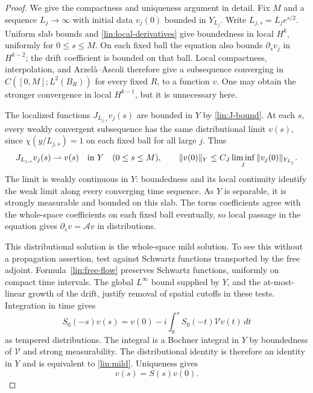 \documentclass[11pt]{article}
\numberwithin{equation}{section}
\theoremstyle{definition}
\theoremstyle{remark}
\begin{document}
\begin{proof}
We give the compactness and uniqueness argument in detail.  Fix $M$
and a sequence $L_j\to\infty$ with initial data $v_j(0)$ bounded in
$Y_{L_j}$.  Write $L_{j,s}=L_je^{s/2}$.  Uniform slab bounds and
\eqref{lin:local-derivatives} give boundedness in local $H^k$, uniformly
for $0\le s\le M$.  On each fixed ball the equation also bounds
$\partial_sv_j$ in $H^{k-2}$; the drift coefficient is bounded on
that ball.  Local compactness, interpolation, and Arzel\`a--Ascoli
therefore give a subsequence converging in
$C([0,M];L^2(B_R))$ for every fixed $R$, to a function $v$.
One may obtain the stronger convergence in local $H^{k-1}$, but it
is unnecessary here.

The localized functions $J_{L_{j,s}}v_j(s)$ are bounded in $Y$ by
\eqref{lin:J-bound}.  At each $s$, every weakly convergent subsequence
has the same distributional limit $v(s)$, since $\chi(y/L_{j,s})=1$
on each fixed ball for all large $j$.  Thus
\begin{equation}\label{lin:weak-local-limit}
 J_{L_{j,s}}v_j(s)\rightharpoonup v(s)\quad\hbox{in }Y
 \quad(0\le s\le M),\qquad
 \|v(0)\|_Y\le C_J\liminf_j\|v_j(0)\|_{Y_{L_j}}.
\end{equation}
The limit is weakly continuous in $Y$: boundedness and its local
continuity identify the weak limit along every converging time
sequence.  As $Y$ is separable, it is strongly measurable and bounded
on this slab.  The torus coefficients agree with the whole-space
coefficients on each fixed ball eventually, so local passage in the
equation gives $\partial_sv=\mathcal Av$ in distributions.

This distributional solution is the whole-space mild solution.
To see this without a propagation assertion, test against Schwartz
functions transported by the free adjoint.  Formula~\eqref{lin:free-flow}
preserves Schwartz functions, uniformly on compact time intervals.
The global $L^\infty$ bound supplied by $Y$, and the at-most-linear
growth of the drift, justify removal of spatial cutoffs in these
tests.  Integration in time gives
\[
 S_0(-s)v(s)=v(0)-i\int_0^s S_0(-t)\mathcal Vv(t)\,dt
\]
as tempered distributions.  The integral is a Bochner integral in
$Y$ by boundedness of $\mathcal V$ and strong measurability.  The
distributional identity is therefore an identity in $Y$ and is
equivalent to \eqref{lin:mild}.  Uniqueness gives
\begin{equation}\label{lin:limit-identification}
 v(s)=S(s)v(0).
\end{equation}


\end{proof}
\end{document}
